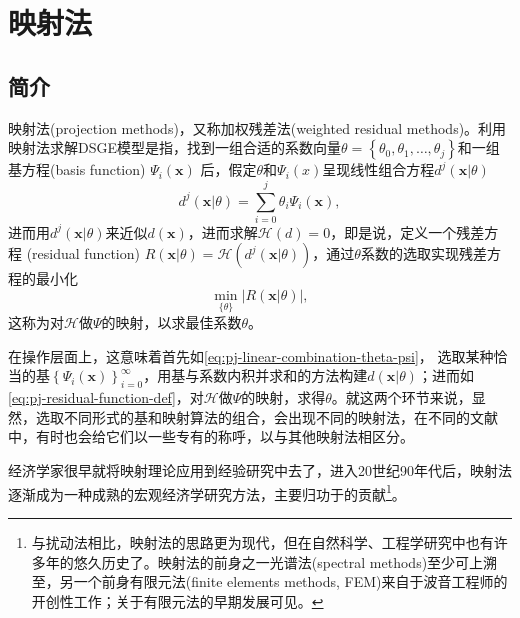 \chapter{映射法}

\section{简介}
映射法(projection methods)，又称加权残差法(weighted residual methods)。利用映射法求解DSGE模型是指，找到一组合适的系数向量$\theta = \left\{
\theta_0, \theta_1, \ldots, \theta_j \right\}$和一组基方程(basis function)  $\Psi_i(\bm{x})$ 后，假定$\theta$和$\Psi_i(x)$呈现线性组合方程$d^{j}(\bm{x}|\theta)$
\begin{equation}
  \label{eq:pj-linear-combination-theta-psi}
  d^{j}(\bm{x}|\theta) = \sum_{i=0}^{j}\theta_{i} \Psi_i(\bm{x}),
\end{equation}
进而用$d^j(\bm{x}|\theta)$来近似$d(\bm{x})$，进而求解$\mathcal{H}(d) = 0$，即是说，定义一个残差方程 (residual function)   $R(\bm{x}|\theta) = \mathcal{H}\left( d^j(\bm{x}|\theta) \right)$，通过$\theta$系数的选取实现残差方程的最小化
\begin{equation}
  \label{eq:pj-residual-function-def}
  \min_{\{\theta\}} \left| R(\bm{x}|\theta) \right|,
\end{equation}
这称为对$\mathcal{H}$做$\Psi$的映射，以求最佳系数$\theta$。

在操作层面上，这意味着首先如\eqref{eq:pj-linear-combination-theta-psi}， 选取某种恰当的基$\left\{ \Psi_i (\bm{x})\right\}_{i=0}^{\infty}$，用基与系数内积并求和的方法构建$d(\bm{x} | \theta)$；进而如\eqref{eq:pj-residual-function-def}，对$\mathcal{H}$做$\Psi$的映射，求得$\theta$。就这两个环节来说，显然，选取不同形式的基和映射算法的组合，会出现不同的映射法，在不同的文献中，有时也会给它们以一些专有的称呼，以与其他映射法相区分。

经济学家很早就将映射理论应用到经验研究中去了，进入20世纪90年代后，映射法逐渐成为一种成熟的宏观经济学研究方法，主要归功于\cite{Judd:1992vv,Gaspar:1997we,Judd:1998uy}的贡献\footnote{与扰动法相比，映射法的思路更为现代，但在自然科学、工程学研究中也有许多年的悠久历史了。映射法的前身之一光谱法(spectral methods)至少可上溯至\cite{Lanczos:1938hy}，另一个前身有限元法(finite elements methods, FEM)来自于波音工程师\cite{Clough:1960wq}的开创性工作；关于有限元法的早期发展可见\cite{Clough:1999uo}。}。

